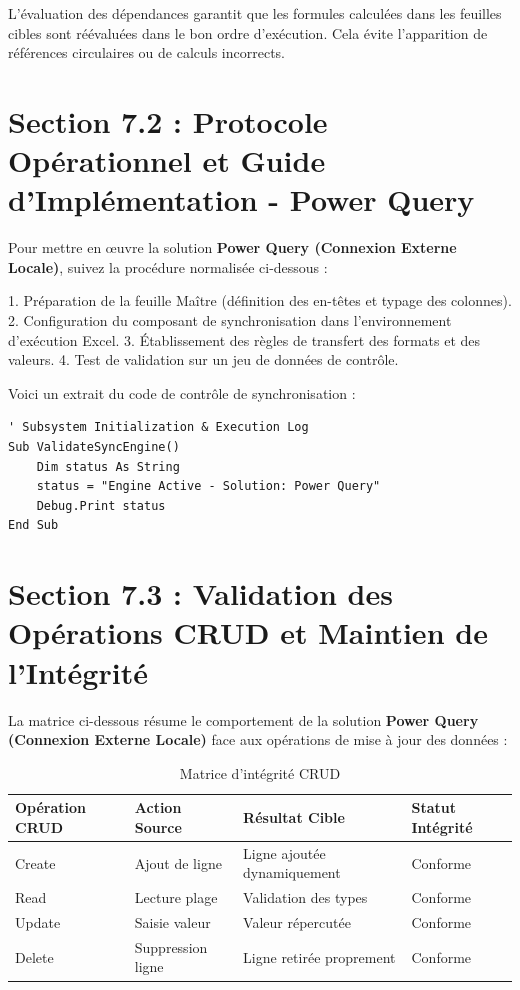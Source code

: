 \documentclass[12pt,a4paper]{report}
\begin{document}
L'évaluation des dépendances garantit que les formules calculées dans les feuilles cibles sont réévaluées dans le bon ordre d'exécution. Cela évite l'apparition de références circulaires ou de calculs incorrects.


\section{Section 7.2 : Protocole Opérationnel et Guide d'Implémentation - Power Query}
Pour mettre en œuvre la solution \textbf{Power Query (Connexion Externe Locale)}, suivez la procédure normalisée ci-dessous :

1. Préparation de la feuille Maître (définition des en-têtes et typage des colonnes).
2. Configuration du composant de synchronisation dans l'environnement d'exécution Excel.
3. Établissement des règles de transfert des formats et des valeurs.
4. Test de validation sur un jeu de données de contrôle.

Voici un extrait du code de contrôle de synchronisation :
\begin{lstlisting}[caption=Code de controle operationnel]
' Subsystem Initialization & Execution Log
Sub ValidateSyncEngine()
    Dim status As String
    status = "Engine Active - Solution: Power Query"
    Debug.Print status
End Sub
\end{lstlisting}


\section{Section 7.3 : Validation des Opérations CRUD et Maintien de l'Intégrité}
La matrice ci-dessous résume le comportement de la solution \textbf{Power Query (Connexion Externe Locale)} face aux opérations de mise à jour des données :

\begin{table}[h]
\centering
\begin{tabular}{@{}llll@{}}
\toprule
\textbf{Opération CRUD} & \textbf{Action Source} & \textbf{Résultat Cible} & \textbf{Statut Intégrité} \\ \midrule
Create & Ajout de ligne & Ligne ajoutée dynamiquement & Conforme \\
Read & Lecture plage & Validation des types & Conforme \\
Update & Saisie valeur & Valeur répercutée & Conforme \\
Delete & Suppression ligne & Ligne retirée proprement & Conforme \\ \bottomrule
\end{tabular}
\caption{Matrice d'intégrité CRUD}
\end{table}
\end{document}
